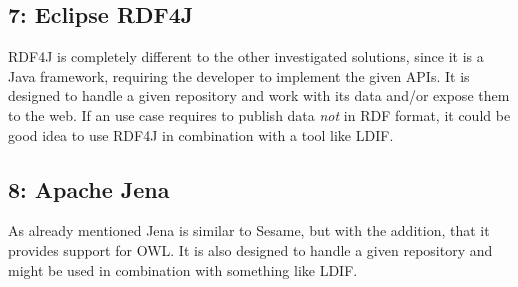 \subsection*{7: Eclipse RDF4J}
RDF4J is completely different to the other investigated solutions, since it is a 
Java framework, requiring the developer to implement the given APIs. It is 
designed to handle a given repository and work with its data and/or expose them to 
the web. If an use case requires to publish data \emph{not} in RDF format, it 
could be good idea to use RDF4J in combination with a tool like LDIF.

\subsection*{8: Apache Jena}
As already mentioned Jena is similar to Sesame, but with the addition, that it 
provides support for OWL. It is also designed to handle a given repository and 
might be used in combination with something like LDIF.